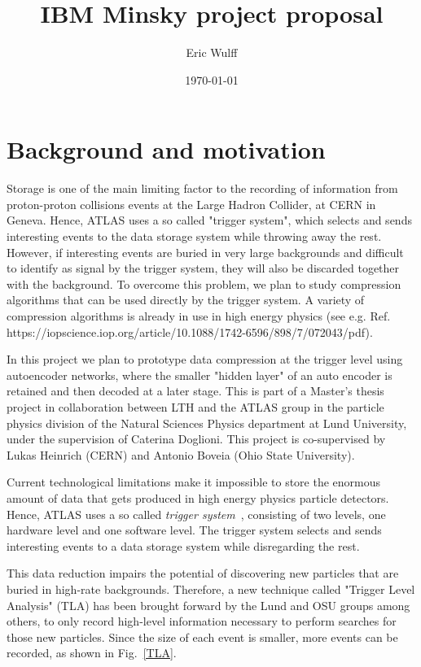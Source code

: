 \documentclass[11pt]{article}
\title{\huge IBM Minsky project proposal}
\author{Eric Wulff}
\date{\today}
\begin{document}
\maketitle

\section{Background and motivation}


Storage is one of the main limiting factor to the recording of information from proton-proton collisions events at the Large Hadron Collider, at CERN in Geneva. Hence, ATLAS uses a so called "trigger system", which selects and sends interesting events to the data storage system while throwing away the rest. However, if interesting events are buried in very large backgrounds and difficult to identify as signal by the trigger system, they will also be discarded together with the background. To overcome this problem, we plan to study compression algorithms that can be used directly by the trigger system. A variety of compression algorithms is already in use in high energy physics (see e.g. Ref.  https://iopscience.iop.org/article/10.1088/1742-6596/898/7/072043/pdf). 

In this project we plan to prototype data compression at the trigger level using autoencoder networks, where the smaller "hidden layer" of an auto encoder is retained and then decoded at a later stage. This is part of a Master's thesis project in collaboration between LTH and the ATLAS group in the particle physics division of the Natural Sciences Physics department at Lund University, under the supervision of Caterina Doglioni. This project is co-supervised by Lukas Heinrich (CERN) and Antonio Boveia (Ohio State University).  


Current technological limitations make it impossible to store the enormous amount of data that gets produced in high energy physics particle detectors. Hence, ATLAS uses a so called \emph{trigger system}~\cite{trigger_das}, consisting of two levels, one hardware level and one software level. The trigger system selects and sends interesting events to a data storage system while disregarding the rest.

This data reduction impairs the potential of discovering new particles that are buried in high-rate backgrounds. Therefore, a new technique called "Trigger Level Analysis" (TLA) has been brought forward by the Lund and OSU groups among others, to only record high-level information necessary to perform searches for those new particles. Since the size of each event is smaller, more events can be recorded, as shown in Fig.~\ref{TLA}. 
\end{document}
